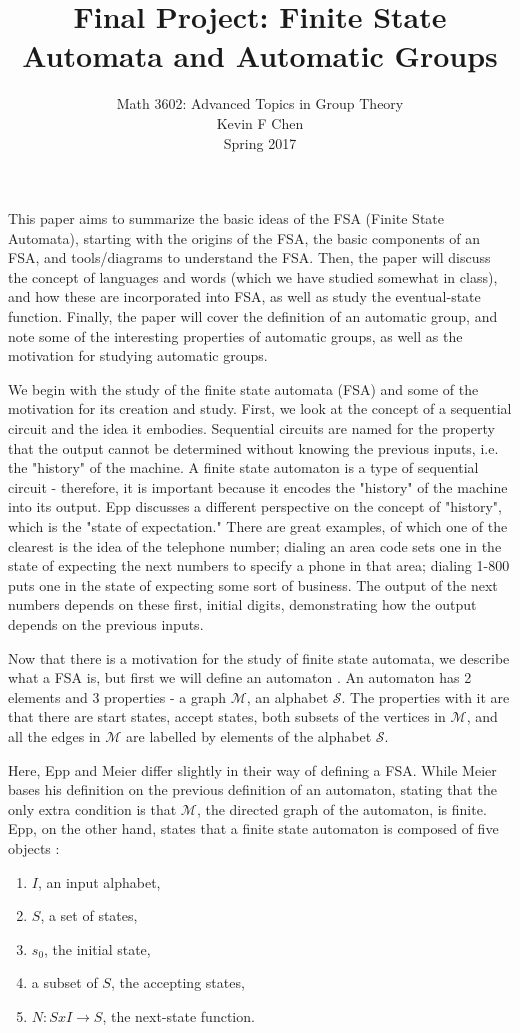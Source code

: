 \documentclass[12pt]{amsart}
\date{}
\title{Final Project: Finite State Automata and Automatic Groups}
\author{Math 3602: Advanced Topics in Group Theory \\ Kevin F Chen \\ Spring 2017}
\begin{document}
\maketitle

This paper aims to summarize the basic ideas of the FSA (Finite State Automata), starting with the origins of the FSA, the basic components of an FSA, and tools/diagrams to understand the FSA. Then, the paper will discuss the concept of languages and words (which we have studied somewhat in class), and how these are incorporated into FSA, as well as study the eventual-state function. Finally, the paper will cover the definition of an automatic group, and note some of the interesting properties of automatic groups, as well as the motivation for studying automatic groups. 

We begin with the study of the finite state automata (FSA) and some of the motivation for its creation and study. First, we look at the concept of a sequential circuit and the idea it embodies. Sequential circuits are named for the property that the output cannot be determined without knowing the previous inputs, i.e. the "history" of the machine. A finite state automaton is a type of sequential circuit - therefore, it is important because it encodes the "history" of the machine into its output\cite{epp}. Epp discusses a different perspective on the concept of "history", which is the "state of expectation." There are great examples, of which one of the clearest is the idea of the telephone number; dialing an area code sets one in the state of expecting the next numbers to specify a phone in that area; dialing 1-800 puts one in the state of expecting some sort of business. The output of the next numbers depends on these first, initial digits, demonstrating how the output depends on the previous inputs.

Now that there is a motivation for the study of finite state automata, we describe what a FSA is, but first we will define an automaton \cite{ggt}. An automaton has 2 elements and 3 properties - a graph $\mathcal{M}$, an alphabet $\mathcal{S}$. The properties with it are that there are start states, accept states, both subsets of the vertices in $\mathcal{M}$, and all the edges in $\mathcal{M}$ are labelled by elements of the alphabet $\mathcal{S}$. 

Here, Epp and Meier differ slightly in their way of defining a FSA. While Meier bases his definition on the previous definition of an automaton, stating that the only extra condition is that $\mathcal{M}$, the directed graph of the automaton, is finite. Epp, on the other hand, states that a finite state automaton is composed of five objects \cite{epp}:
\begin{enumerate}
\item $I$, an input alphabet,
\item $S$, a set of states,
\item $s_0$, the initial state,
\item a subset of $S$, the accepting states,
\item $N:SxI\rightarrow S$, the next-state function.
\end{enumerate}
\end{document}
